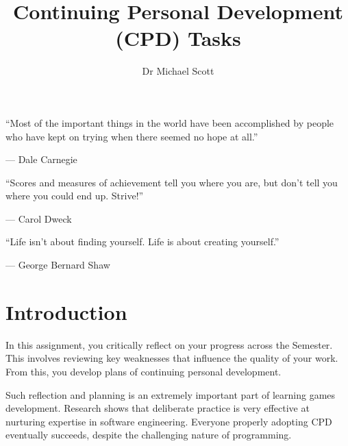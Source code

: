 \documentclass{../../fal_assignment}
\title{Continuing Personal Development (CPD) Tasks}
\author{Dr Michael Scott}
\begin{document}
\maketitle
%    
\begin{marginquote}
    ``Most of the important things in the world have been accomplished by people who have kept on trying when there seemed no hope at all.''
    
    --- Dale Carnegie

    \marginquoterule

    ``Scores and measures of achievement tell you where you are, but don't tell you where you could end up. Strive!''
    
    --- Carol Dweck
    
    \marginquoterule
    
    ``Life isn't about finding yourself. Life is about creating yourself.''
    
     --- George Bernard Shaw             
\end{marginquote}

\section*{Introduction}

In this assignment, you critically reflect on your progress across the Semester. This involves reviewing key weaknesses that influence the quality of your work. From this, you develop plans of continuing personal development.

Such reflection and planning is an extremely important part of learning games development. Research shows that deliberate practice is very effective at nurturing expertise in software engineering. Everyone properly adopting CPD eventually succeeds, despite the challenging nature of programming.
\end{document}
